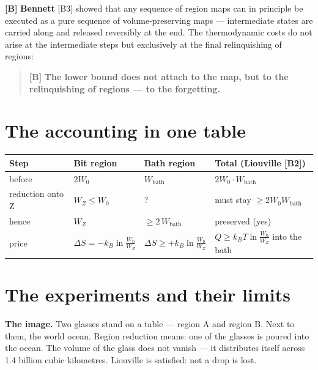 \textbf{[B]} \textbf{Bennett} [B3] showed that any sequence of region maps can in principle
be executed as a pure sequence of volume-preserving maps --- intermediate states
are carried along and released reversibly at the end. The thermodynamic costs do
not arise at the intermediate steps but exclusively at the final relinquishing of
regions:

\begin{quote}
\textbf{[B]} \textbf{The lower bound does not attach to the map, but to the relinquishing
of regions --- to the forgetting.}
\end{quote}

\section{The accounting in one table}

\begin{center}
\small
\begin{tabular}{@{}llll@{}}
\toprule
\textbf{Step} & \textbf{Bit region} & \textbf{Bath region} & \textbf{Total (Liouville [B2])} \\
\midrule
before & $2W_0$ & $W_{\text{bath}}$ & $2W_0 \cdot W_{\text{bath}}$ \\
reduction onto Z & $W_Z \le W_0$ & ? & must stay $\ge 2W_0 W_{\text{bath}}$ \\
hence & $W_Z$ & $\ge 2\,W_{\text{bath}}$ & preserved (yes) \\
price & $\Delta S = -k_B \ln\frac{W_{\text{b}}}{W_Z}$ & $\Delta S \ge +k_B \ln\frac{W_{\text{b}}}{W_Z}$ & $Q \ge k_B T \ln\frac{W_{\text{b}}}{W_Z}$ into the bath \\
\bottomrule
\end{tabular}
\end{center}

\section{The experiments and their limits}
\label{sec:experiments}

\textbf{The image.} Two glasses stand on a table --- region A and region B. Next
to them, the world ocean. Region reduction means: one of the glasses is poured
into the ocean. The volume of the glass does not vanish --- it distributes itself
across 1.4 billion cubic kilometres. Liouville is satisfied: not a drop is lost.

